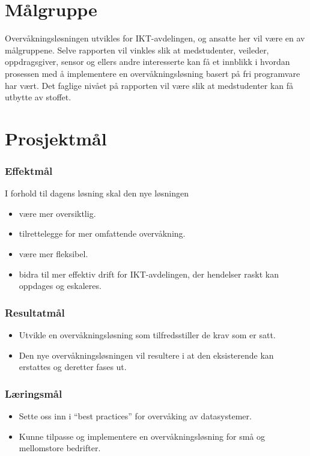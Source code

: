 \section{Målgruppe}
Overvåkningsløsningen utvikles for IKT-avdelingen, og ansatte her vil være en av målgruppene. Selve rapporten vil vinkles slik at medstudenter, veileder, oppdragsgiver, sensor og ellers andre interesserte kan få et innblikk i hvordan prosessen med å implementere en overvåkningsløsning basert på fri programvare har vært. Det faglige nivået på rapporten vil være slik at medstudenter kan få utbytte av stoffet.

\section{Prosjektmål}
\subsubsection{Effektmål}
I forhold til dagens løsning skal den nye løsningen
\begin{itemize}
	\item være mer oversiktlig.
	\item tilrettelegge for mer omfattende overvåkning.
	\item være mer fleksibel.
	\item bidra til mer effektiv drift for IKT-avdelingen, der hendelser raskt kan oppdages og eskaleres.
\end{itemize}

\subsubsection{Resultatmål}
\begin{itemize}
	\item Utvikle en overvåkningsløsning som tilfredsstiller de krav som er satt.
	\item Den nye overvåkningsløsningen vil resultere i at den eksisterende kan erstattes og deretter fases ut.
\end{itemize}

\subsubsection{Læringsmål}
\begin{itemize}
	\item Sette oss inn i ``best practices'' for overvåking av datasystemer.
	\item Kunne tilpasse og implementere en overvåkningsløsning for små og mellomstore bedrifter.
\end{itemize}

